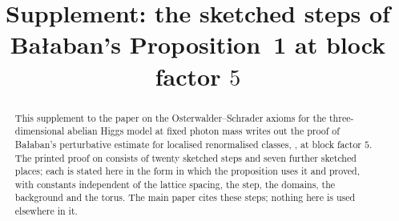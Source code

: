 

\title[Supplement: Ba{\l}aban's Proposition~1 at block factor $5$]{Supplement: the sketched steps of Ba{\l}aban's Proposition~1 at block factor $5$}
\author{}
\date{}



\begin{abstract}
This supplement to the paper on the Osterwalder--Schrader axioms for the three-dimensional abelian Higgs model at fixed photon mass writes out the proof of Ba{\l}aban's perturbative estimate for localised renormalised classes, \cite[Prop.~1, (1.33)]{Ba3}, at block factor $5$. The printed proof on \cite[pp.~420--445]{Ba3} consists of twenty sketched steps and seven further sketched places; each is stated here in the form in which the proposition uses it and proved, with constants independent of the lattice spacing, the step, the domains, the background and the torus. The main paper cites these steps; nothing here is used elsewhere in it.
\end{abstract}

\maketitle

\tableofcontents















